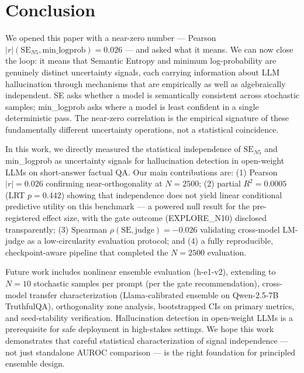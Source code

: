 \section{Conclusion}
\label{sec:conclusion}

We opened this paper with a near-zero number --- Pearson $|r|(\text{SE}_{N5}, \text{min\_logprob}) = 0.026$ --- and asked what it means. We can now close the loop: it means that Semantic Entropy and minimum log-probability are genuinely distinct uncertainty signals, each carrying information about LLM hallucination through mechanisms that are empirically as well as algebraically independent. SE asks whether a model is semantically consistent across stochastic samples; min\_logprob asks where a model is least confident in a single deterministic pass. The near-zero correlation is the empirical signature of these fundamentally different uncertainty operations, not a statistical coincidence.

In this work, we directly measured the statistical independence of $\text{SE}_{N5}$ and min\_logprob as uncertainty signals for hallucination detection in open-weight LLMs on short-answer factual QA. Our main contributions are: (1) Pearson $|r|=0.026$ confirming near-orthogonality at $N=2500$; (2) partial $R^2=0.0005$ (LRT $p=0.442$) showing that independence does not yield linear conditional predictive utility on this benchmark --- a powered null result for the pre-registered effect size, with the gate outcome (EXPLORE\_N10) disclosed transparently; (3) Spearman $\rho(\text{SE}, \text{judge})=-0.026$ validating cross-model LM-judge as a low-circularity evaluation protocol; and (4) a fully reproducible, checkpoint-aware pipeline that completed the $N=2500$ evaluation.

Future work includes nonlinear ensemble evaluation (h-e1-v2), extending to $N=10$ stochastic samples per prompt (per the gate recommendation), cross-model transfer characterization (Llama-calibrated ensemble on Qwen-2.5-7B TruthfulQA), orthogonality zone analysis, bootstrapped CIs on primary metrics, and seed-stability verification. Hallucination detection in open-weight LLMs is a prerequisite for safe deployment in high-stakes settings. We hope this work demonstrates that careful statistical characterization of signal independence --- not just standalone AUROC comparison --- is the right foundation for principled ensemble design.
